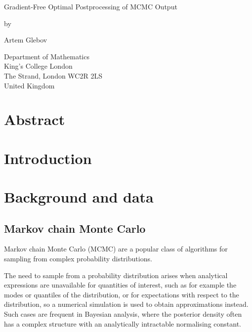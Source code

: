 \documentclass[12pt,a4paper]{report}
\date{}
\begin{document}
\thispagestyle{empty}
\begin{center}
{\huge
Gradient-Free Optimal Postprocessing of MCMC Output

\bigskip
\bigskip

by
\bigskip
\bigskip

Artem Glebov
}
\end{center}
\vfill

\begin{center}
{\large
Department of Mathematics\\
King's College London\\
The Strand, London WC2R 2LS\\
United Kingdom\\
\medskip

}
\end{center}
\bigskip


\newpage
\setcounter{page}{1}

\chapter*{Abstract}


\tableofcontents


\chapter*{Introduction}

\chapter{Background and data}

\section{Markov chain Monte Carlo}

Markov chain Monte Carlo (MCMC) are a popular class of algorithms for sampling from complex probability distributions.

The need to sample from a probability distribution arises when analytical expressions are unavailable for quantities of interest, such as for example the modes or quantiles of the distribution, or for expectations with respect to the distribution, so a numerical simulation is used to obtain approximations instead. Such cases are frequent in Bayesian analysis, where the posterior density often has a complex structure with an analytically intractable normalising constant.
\end{document}
